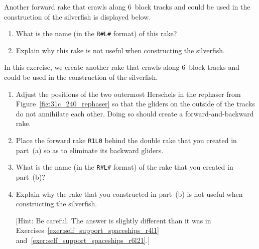 \begin{multicols}{2}
	
	\mfilbreak
	
	
	\begin{problem}\label{exer:self_support_spaceships_r6l21} 
		Another forward rake that crawls along $6$~block tracks and could be used in the construction of the silverfish is displayed below.
		\begin{center}
		\end{center}
		
		\begin{enumerate}[label=\bf\color{ocre}(\alph*)]
			\item What is the name (in the \texttt{R\#L\#} format) of this rake?
			
			\item Explain why this rake is not useful when constructing the silverfish.
		\end{enumerate}
	\end{problem}
	
	
	\mfilbreak
	
	
	\begin{problemstar}\label{exer:self_support_spaceships_r2l16} 
		In this exercise, we create another rake that crawls along $6$~block tracks and could be used in the construction of the silverfish.\smallskip
		
		\begin{enumerate}[label=\bf\color{ocre}(\alph*)]
			\item Adjust the positions of the two outermost Herschels in the rephaser from Figure~\ref{fig:31c_240_rephaser} so that the gliders on the outside of the tracks do not annihilate each other. Doing so should create a forward-and-backward rake.
			
			\item Place the forward rake \texttt{R1L0} behind the double rake that you created in part~(a) so as to eliminate its backward gliders.
			
			\item What is the name (in the \texttt{R\#L\#} format) of the rake that you created in part~(b)?
			
			\item Explain why the rake that you constructed in part~(b) is not useful when constructing the silverfish.
			
			[Hint: Be careful. The answer is slightly different than it was in Exercises~\ref{exer:self_support_spaceships_r4l1} and~\ref{exer:self_support_spaceships_r6l21}.]
		\end{enumerate}
	\end{problemstar}
	

\end{multicols}
